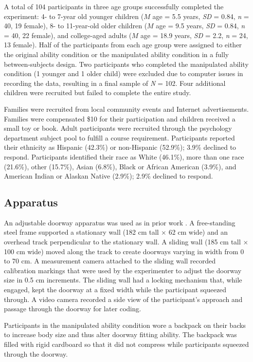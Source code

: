 \documentclass[a4paper,man,natbib,floatsintext,noextraspace]{apa6}
\begin{document}
A total of 104 participants in three age groups successfully completed the experiment: 4- to 7-year old younger children ($M$ age = 5.5 years, \textit{SD} = 0.84, \textit{n} = 40, 19 female), 8- to 11-year-old older children ($M$ age = 9.5 years, \textit{SD} = 0.84, \textit{n} = 40, 22 female), and college-aged adults ($M$ age = 18.9 years, \textit{SD} = 2.2, \textit{n} = 24, 13 female). Half of the participants from each age group were assigned to either the original ability condition or the manipulated ability condition in a fully between-subjects design. Two participants who completed the manipulated ability condition (1 younger and 1 older child) were excluded due to computer issues in recording the data, resulting in a final sample of \textit{N} = 102. Four additional children were recruited but failed to complete the entire study. 

Families were recruited from local community events and Internet advertisements. Families were compensated \$10 for their participation and children received a small toy or book. Adult participants were recruited through the psychology department subject pool to fulfill a course requirement. Participants reported their ethnicity as Hispanic (42.3\%) or non-Hispanic (52.9\%); 3.9\% declined to respond. Participants identified their race as White (46.1\%), more than one race (21.6\%), other (15.7\%), Asian (6.8\%), Black or African American (3.9\%), and American Indian or Alaskan Native (2.9\%); 2.9\% declined to respond.

\subsection{Apparatus}

An adjustable doorway apparatus was used as in prior work \citep{DoorwayLearning,Recal}. A free-standing steel frame supported a stationary wall (182 cm tall × 62 cm wide) and an overhead track perpendicular to the stationary wall. A sliding wall (185 cm tall × 100 cm wide) moved along the track to create doorways varying in width from 0 to 70 cm. A measurement camera attached to the sliding wall recorded calibration markings that were used by the experimenter to adjust the doorway size in 0.5 cm increments. The sliding wall had a locking mechanism that, while engaged, kept the doorway at a fixed width while the participant squeezed through. A video camera recorded a side view of the participant’s approach and passage through the doorway for later coding.

Participants in the manipulated ability condition wore a backpack  on their backs to increase body size and thus alter doorway fitting ability. The backpack was filled with rigid cardboard so that it did not compress while participants squeezed through the doorway. 
\end{document}
